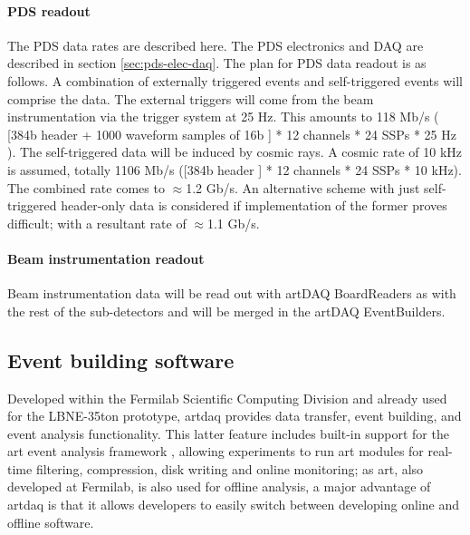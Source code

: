 \paragraph{PDS readout} 
The PDS data rates are described here.  The PDS electronics and DAQ are
described in section \ref{sec:pds-elec-daq}.  The plan for PDS data
readout is as follows.  A combination of externally triggered events
and self-triggered events will comprise the data.  The external triggers
will come from the beam instrumentation via the trigger system at 25 Hz.
This amounts to 118 Mb/s ( [384b header + 1000 waveform samples of
16b ] * 12 channels * 24 SSPs * 25 Hz ).  The self-triggered data
will be induced by cosmic rays.  A cosmic rate of 10 kHz is assumed,
totally 1106 Mb/s ([384b header ] * 12 channels * 24 SSPs * 10 kHz).
The combined rate comes to $\approx$1.2 Gb/s.  An alternative scheme with
just self-triggered header-only data is considered if implementation of
the former proves difficult; with a resultant rate of $\approx$1.1 Gb/s.


\paragraph{Beam instrumentation readout}

Beam instrumentation data will be read out with artDAQ BoardReaders as with 
the rest of the sub-detectors and will be merged in the artDAQ EventBuilders.

\subsection{Event building software }




Developed within the Fermilab Scientific Computing Division and
already used for the LBNE-35ton prototype, artdaq provides data
transfer, event building, and event analysis functionality. This
latter feature includes built-in support for the art event analysis
framework \cite{fnal:art}, allowing experiments to run art modules for real-time
filtering, compression, disk writing and online monitoring; as art,
also developed at Fermilab, is also used for offline analysis, a major
advantage of artdaq is that it allows developers to easily switch
between developing online and offline software.

